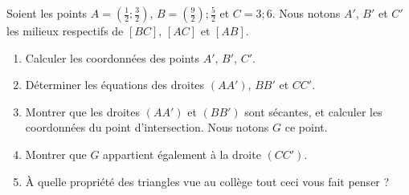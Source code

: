 
\begin{exercice}\label{exosmath-0241}

    Soient les points \( A=(\frac{1}{ 2 };\frac{ 3 }{ 2 })\), \( B=(\frac{ 9 }{2});\frac{ 5 }{2}\) et \( C=3;6\). Nous notons $A'$, \( B'\) et \( C'\) les milieux respectifs de \( [BC]\), \( [AC]\) et \( [AB]\).
    \begin{enumerate}
        \item
            Calculer les coordonnées des points \( A'\), \( B'\), \( C'\).
        \item
            Déterminer les équations des droites \( (AA')\), \( BB'\) et \( CC'\).
        \item
            Montrer que les droites \( (AA')\) et \( (BB')\) sont sécantes, et calculer les coordonnées du point d'intersection. Nous notons \( G\) ce point.
        \item
            Montrer que \( G\) appartient également à la droite \( (CC')\).
        \item
            À quelle propriété des triangles vue au collège tout ceci vous fait penser ?
    \end{enumerate}


\end{exercice}
